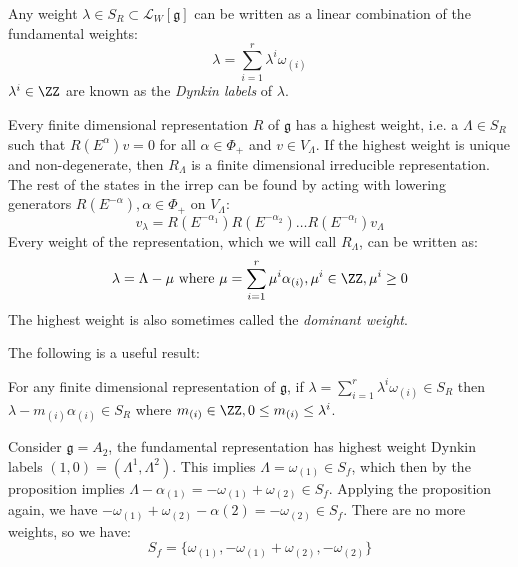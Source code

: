 \documentclass{jknotes}
\begin{document}
Any weight \(\lambda \in S_R \subset \mathcal{L}_W[\mathfrak{g}]\) can be written as a linear combination of the fundamental weights:
\begin{equation}
    \lambda = \sum_{i=1}^r \lambda^i\omega_{(i)}
\end{equation}
\(\lambda^i \in \ZZ\) are known as the \emph{Dynkin labels} of \(\lambda\).

Every finite dimensional representation \(R\) of \(\mathfrak{g}\) has a highest weight, i.e. a \(\Lambda \in S_R\) such that \(R(E^\alpha)v = 0\) for all \(\alpha \in \Phi_+\) and \(v \in V_\Lambda\). If the highest weight is unique and non-degenerate, then \(R_\Lambda\) is a finite dimensional irreducible representation. The rest of the states in the irrep can be found by acting with lowering generators \(R(E^{-\alpha}), \alpha \in \Phi_+\) on \(V_\Lambda\):
\begin{equation}
    v_\lambda = R(E^{-\alpha_1})R(E^{-\alpha_2}) \dots R(E^{-\alpha_l}) v_\Lambda
\end{equation}
Every weight of the representation, which we will call \(R_\Lambda\), can be written as:
\begin{equation}
    \lambda = \Lambda-\mu \text{ where } \mu = \sum_{i=1}^r\mu^i\alpha_{(i)}, \mu^i \in \ZZ, \mu^i \ge 0
\end{equation}
The highest weight is also sometimes called the \emph{dominant weight}.

The following is a useful result:
\begin{lemma}
    For any finite dimensional representation of \(\mathfrak{g}\), if \(\lambda = \sum_{i=1}^r \lambda^i \omega_{(i)} \in S_R\) then \(\lambda-m_{(i)}\alpha_{(i)} \in S_R\) where \(m_{(i)} \in \ZZ, 0 \le m_{(i)} \le \lambda^i\).
\end{lemma}

\begin{eg}
    Consider \(\mathfrak{g}=A_2\), the fundamental representation has highest weight Dynkin labels \((1,0) = (\Lambda^1,\Lambda^2)\). This implies \(\Lambda = \omega_{(1)} \in S_f\), which then by the proposition implies \(\Lambda-\alpha_{(1)} = -\omega_{(1)}+\omega_{(2)} \in S_f\). Applying the proposition again, we have \(-\omega_{(1)}+\omega_{(2)} -\alpha{(2)} = -\omega_{(2)} \in S_f\). There are no more weights, so we have:
    \begin{equation}
        S_f = \{\omega_{(1)},-\omega_{(1)}+\omega_{(2)},-\omega_{(2)}\}
    \end{equation}
\end{eg}
\end{document}

